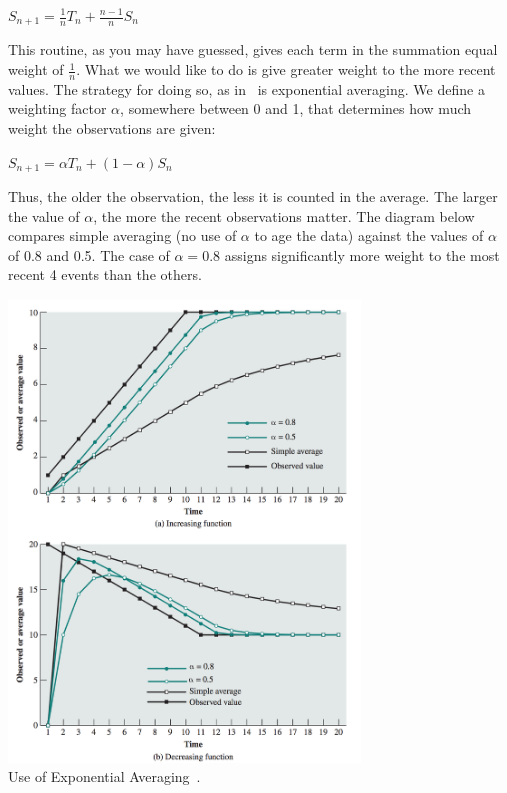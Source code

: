 \begin{center}
$S_{n+1} = \frac{1}{n}T_{n} + \frac{n - 1}{n} S_{n}$
\end{center}

This routine, as you may have guessed, gives each term in the summation equal weight of $\frac{1}{n}$. What we would like to do is give greater weight to the more recent values. The strategy for doing so, as in~\cite{osi} is exponential averaging. We define a weighting factor $\alpha$, somewhere between 0 and 1, that determines how much weight the observations are given:

\begin{center}
$S_{n+1} = \alpha T_{n} + (1 - \alpha) S_{n}$
\end{center}

Thus, the older the observation, the less it is counted in the average. The larger the value of $\alpha$, the more the recent observations matter. The diagram below compares simple averaging (no use of $\alpha$ to age the data) against the values of $\alpha$ of 0.8 and 0.5. The case of $\alpha = 0.8$ assigns significantly more weight to the most recent 4 events than the others.

\begin{center}
	\includegraphics[width=0.7\textwidth]{images/exponential-averaging.png}\\
	Use of Exponential Averaging~\cite{osi}.
\end{center}


